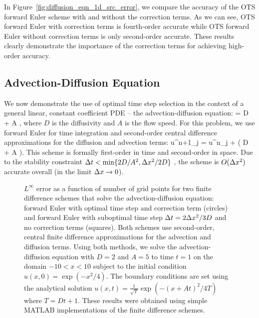 \documentclass[oneeqnum,onefignum,onetabnum,onethmnum]{siamltex}
\begin{document}
In Figure~\ref{fig:diffusion_eqn_1d_src_error}, we compare the accuracy of 
the OTS forward Euler scheme with and without the correction terms.  As we can 
see, OTS forward Euler with correction terms is fourth-order accurate while 
OTS forward Euler without correction terms is only second-order accurate.  
These results clearly demonstrate the importance of the correction terms for
achieving high-order accuracy.


\subsection{Advection-Diffusion Equation}
We now demonstrate the use of optimal time step selection in the context of 
a general linear, constant coefficient PDE -- the advection-diffusion 
equation:
\beq
   = D  
  + A ,
  \label{eq:ADE_1d}
\eeq
where $D$ is the diffusivity and $A$ is the flow speed.  For this problem,
we use forward Euler for time integration and second-order central 
difference approximations for the diffusion and advection terms:
\beq
  u^{n+1}_j = u^{n}_j 
  + \dt 
    \left( D 
         + A  \right).
  \label{eq:ADE_1d_FD_scheme}
\eeq
This scheme is formally first-order in time and second-order in space.  
Due to the stability constraint $\Delta t < \min \{2D/A^2, \Delta x^2/2D \}$ 
\cite{chan_1984}, the scheme is $O(\Delta x^2)$ accurate overall (in the limit 
$\Delta x \rightarrow 0$).

\begin{figure}[tb]
\begin{center}
\caption{$L^\infty$ error as a function of number of grid points for 
two finite difference schemes that solve the advection-diffusion 
equation: forward Euler with optimal time step and correction term (circles) 
and forward Euler with suboptimal time step $\Delta t = 2\Delta x^2/3D$ and no correction 
terms (squares).  Both schemes use second-order, central finite difference 
approximations for the advection and diffusion terms.
Using both methods, we solve the advection-diffusion equation with $D = 2$
and $A = 5$ to time $t = 1$ on the domain $-10 < x < 10$ subject to the 
initial condition $u(x,0) = \exp(-x^2/4)$.  The boundary conditions are set 
using the analytical solution 
$u(x,t) = \frac{1}{\sqrt{T}} \exp \left( -(x+At)^2/4T \right)$
where $T = Dt+1$.
These results were obtained using simple MATLAB implementations of the 
finite difference schemes.
}
\label{fig:ADE_1d_error}
\end{center}
\end{figure}
\end{document}

